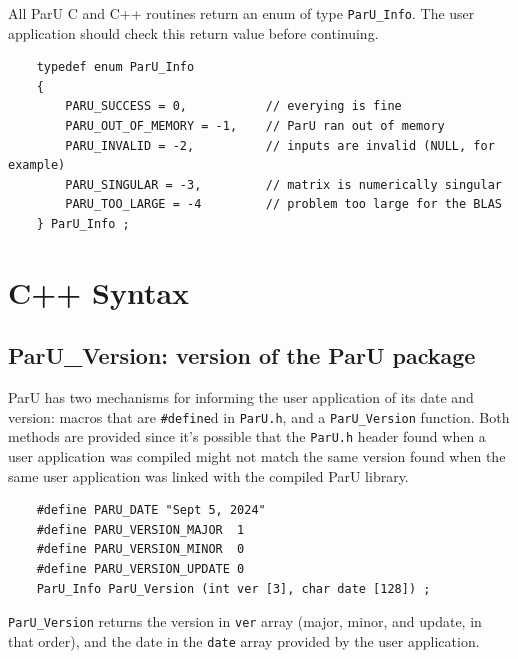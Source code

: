 \documentclass[12pt]{article}
\begin{document}
    All ParU C and C++ routines return an enum of type \verb'ParU_Info'.  The
    user application should check this return value before continuing.

    {\footnotesize
    \begin{verbatim}
    typedef enum ParU_Info
    {
        PARU_SUCCESS = 0,           // everying is fine
        PARU_OUT_OF_MEMORY = -1,    // ParU ran out of memory
        PARU_INVALID = -2,          // inputs are invalid (NULL, for example)
        PARU_SINGULAR = -3,         // matrix is numerically singular
        PARU_TOO_LARGE = -4         // problem too large for the BLAS
    } ParU_Info ; \end{verbatim}}

\section{C++ Syntax}

\subsection{{\sf ParU\_Version}: version of the ParU package}

    ParU has two mechanisms for informing the user application of its date and
    version: macros that are \verb'#define'd in \verb'ParU.h', and a
    \verb'ParU_Version' function.  Both methods are provided since it's
    possible that the \verb'ParU.h' header found when a user application was
    compiled might not match the same version found when the same user
    application was linked with the compiled ParU library.

    {\footnotesize
    \begin{verbatim}
    #define PARU_DATE "Sept 5, 2024"
    #define PARU_VERSION_MAJOR  1
    #define PARU_VERSION_MINOR  0
    #define PARU_VERSION_UPDATE 0
    ParU_Info ParU_Version (int ver [3], char date [128]) ; \end{verbatim}}

    \verb'ParU_Version' returns the version in \verb'ver' array (major, minor,
    and update, in that order), and the date in the \verb'date' array provided
    by the user application.
\end{document}
